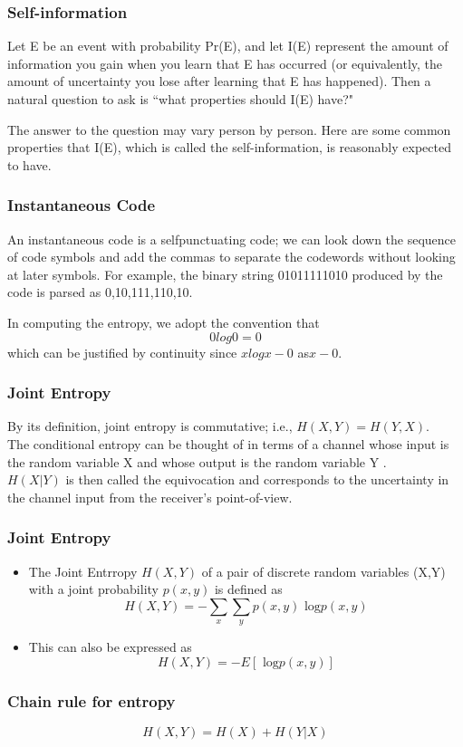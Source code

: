 \begin{frame}
\frametitle{Self-information}

Let E be an event with probability Pr(E), and let I(E) represent the amount
of information you gain when you learn that E has occurred (or equivalently,
the amount of uncertainty you lose after learning that E has happened). Then
a natural question to ask is ``what properties should I(E) have?" 

The answer
to the question may vary person by person. Here are some common properties
that I(E), which is called the self-information, is reasonably expected to have.

\end{frame}
\begin{frame}
\frametitle{Instantaneous Code}
An instantaneous code is a selfpunctuating
code; we can look down the sequence of code symbols and
add the commas to separate the codewords without looking at later symbols.
For example, the binary string 01011111010 produced by the code
is parsed as 0,10,111,110,10.
\end{frame}
\begin{frame}
In computing the entropy, we adopt the convention that
\[0  log 0 = 0\]
which can be justified by continuity since $x log x - 0$ as$ x - 0$.

\end{frame}


\begin{frame}

\frametitle{Joint Entropy}
By its definition, joint entropy is commutative; i.e., $H(X,Y ) = H(Y,X)$.
\\
The conditional entropy can be thought of in terms of a channel whose input
is the random variable X and whose output is the random variable Y . \\

$H(X|Y )$ is
then called the equivocation and corresponds to the uncertainty in the channel
input from the receiver's point-of-view.
\end{frame}
\begin{frame}

\frametitle{Joint Entropy}
\begin{itemize}
	\item The Joint Entrropy $H(X,Y)$ of a pair of discrete random variables (X,Y) with a joint probability $p(x,y)$ is defined as
	\[ H(X,Y) = -\sum_x \sum_y p(x,y) \mbox{ log}p(x,y)\]
	\item This can also be expressed as 
	\[ H(X,Y) = - E[\mbox{ log}p(x,y)]\]
\end{itemize}
\end{frame}
\begin{frame}
\frametitle{Chain rule for entropy}
\[H(X, Y ) = H(X) + H(Y |X)\]
\end{frame}


